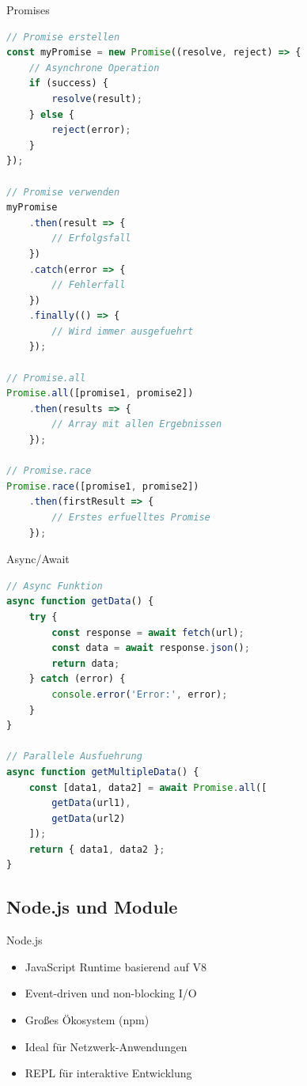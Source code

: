 \begin{KR}{Promises}
\begin{lstlisting}[language=JavaScript, style=basesmol]
// Promise erstellen
const myPromise = new Promise((resolve, reject) => {
    // Asynchrone Operation
    if (success) {
        resolve(result);
    } else {
        reject(error);
    }
});

// Promise verwenden
myPromise
    .then(result => {
        // Erfolgsfall
    })
    .catch(error => {
        // Fehlerfall
    })
    .finally(() => {
        // Wird immer ausgefuehrt
    });

// Promise.all
Promise.all([promise1, promise2])
    .then(results => {
        // Array mit allen Ergebnissen
    });

// Promise.race
Promise.race([promise1, promise2])
    .then(firstResult => {
        // Erstes erfuelltes Promise
    });
\end{lstlisting}
\end{KR}

\begin{KR}{Async/Await}
\begin{lstlisting}[language=JavaScript, style=basesmol]
// Async Funktion
async function getData() {
    try {
        const response = await fetch(url);
        const data = await response.json();
        return data;
    } catch (error) {
        console.error('Error:', error);
    }
}

// Parallele Ausfuehrung
async function getMultipleData() {
    const [data1, data2] = await Promise.all([
        getData(url1),
        getData(url2)
    ]);
    return { data1, data2 };
}
\end{lstlisting}
\end{KR}

\subsection{Node.js und Module}

\begin{concept}{Node.js}
    \begin{itemize}
        \item JavaScript Runtime basierend auf V8
        \item Event-driven und non-blocking I/O
        \item Großes Ökosystem (npm)
        \item Ideal für Netzwerk-Anwendungen
        \item REPL für interaktive Entwicklung
    \end{itemize}
\end{concept}

